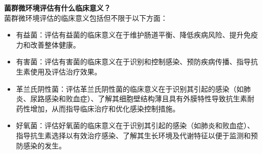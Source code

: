 \documentclass[UTF8]{ctexart}
\begin{document}
\begin{tcolorbox}[
    enhanced,
    colback=lightpurple!10, %
    colframe=white,  %
    arc=3mm,
    boxrule=0.5pt,
    width=\textwidth,
    top=8pt,
    bottom=8pt
]
{\normalsize{\color{lightpurple}\faQuestionCircle}\quad \textbf{菌群微环境评估有什么临床意义？}\\
{\color{orange!50}\faComments}\quad 菌群微环境评估的临床意义包括但不限于以下方面：
\begin{itemize}
    \item 有益菌：评估有益菌的临床意义在于维护肠道平衡、降低疾病风险、提升免疫力和改善整体健康。
    \item 有害菌：评估有害菌的临床意义在于识别和控制感染、预防疾病传播、指导抗生素使用及评估治疗效果。
    \item 革兰氏阴性菌：评估革兰氏阴性菌的临床意义在于识别其引起的感染（如肺炎、尿路感染和败血症）、了解其细胞壁结构薄且具有外膜特性导致抗生素耐药性增加，从而指导临床治疗和优化感染控制措施。
    \item 好氧菌：评估好氧菌的临床意义在于识别其引起的感染（如肺炎和败血症）、指导抗生素选择以有效治疗感染、了解其生长环境及代谢特征以便于监测和预防感染的发生。
\end{itemize}
}
\end{tcolorbox}
\vspace{-0.5cm}
\end{document}
